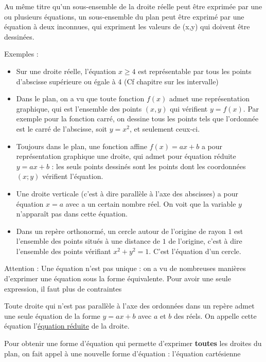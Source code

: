 \documentclass[10pt,a4paper,oneside]{book}
\begin{document}
\begin{de}
    Au même titre qu'un sous-ensemble de la droite réelle peut être exprimée par une ou plusieurs équations, un sous-ensemble du plan peut être exprimé par une équation à deux inconnues, qui expriment les valeurs de (x,y) qui doivent être dessinées.
\end{de}

Exemples : \begin{itemize}
  \item Sur une droite réelle, l'équation $x \geq 4$ est représentable par tous les points d'abscisse supérieure ou égale à 4 (Cf chapitre sur les intervalle)
  \item Dans le plan, on a vu que toute fonction $f(x)$ admet une représentation graphique, qui est l'ensemble des points $(x,y)$ qui vérifient $y=f(x)$. Par exemple pour la fonction carré, on dessine tous les points tels que l'ordonnée est le carré de l'abscisse, soit $y=x^2$, et seulement ceux-ci.
  \item Toujours dans le plan, une fonction affine $f(x)=ax+b$ a pour représentation graphique une droite, qui admet pour équation réduite $y=ax+b$ : les seuls points dessinés sont les points dont les coordonnées $(x;y)$ vérifient l'équation.
  \item Une droite verticale (c'est à dire parallèle à l'axe des abscisses) a pour équation $x=a$ avec a un certain nombre réel. On voit que la variable $y$ n'apparaît pas dans cette équation.
  \item Dans un repère orthonormé, un cercle autour de l'origine de rayon $1$ est l'ensemble des points situés à une distance de $1$ de l'origine, c'est à dire l'ensemble des points vérifiant $x^2+y^2=1$. C'est l'équation d'un cercle.
\end{itemize}


Attention : Une équation n'est pas unique : on a vu de nombreuses manières d'exprimer une équation sous la forme équivalente.  Pour avoir une seule expression, il faut plus de contraintes


\begin{de}
  Toute droite qui n'est pas parallèle à l'axe des ordonnées dans un repère admet une seule équation de la forme $y=ax+b$ avec $a$ et $b$ des réels. On appelle cette équation l'\underline{équation réduite} de la droite.
\end{de}

Pour obtenir une forme d'équation qui permette d'exprimer \textbf{toutes} les droites du plan, on fait appel à une nouvelle forme d'équation : l'équation cartésienne
\end{document}
